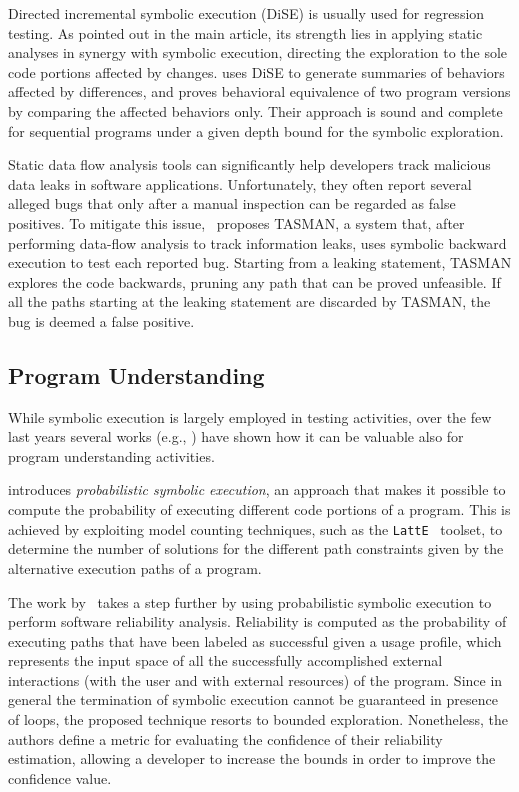 Directed incremental symbolic execution (DiSE) is usually used for regression testing. As pointed out in the main article, its strength lies in applying static analyses in synergy with symbolic execution, directing the exploration to the sole code portions affected by changes. \cite{BPR-SPIN13} uses DiSE to generate summaries of behaviors affected by differences, and proves behavioral equivalence of two program versions by comparing the affected behaviors only. Their approach is sound and complete for sequential programs under a given depth bound for the symbolic exploration.

\smallskip
Static data flow analysis tools can significantly help developers track malicious data leaks in software applications. Unfortunately, they often report several alleged bugs that only after a manual inspection can be regarded as false positives. To mitigate this issue,~\cite{ARH-SOAP15} proposes TASMAN, a system that, after performing data-flow analysis to track information leaks, uses symbolic backward execution to test each reported bug. Starting from a leaking statement, TASMAN explores the code backwards, pruning any path that can be proved unfeasible. If all the paths starting at the leaking statement are discarded by TASMAN, the bug is deemed a false positive.

\subsection{Program Understanding}
While symbolic execution is largely employed in testing activities, over the few last years several works (e.g., \cite{GDV-ISSTA12,FPV-ICSE13,CLL-ICSE16}) have shown how it can be valuable also for program understanding activities.

\cite{GDV-ISSTA12} introduces {\em probabilistic symbolic execution}, an approach that makes it possible to compute the probability of executing different code portions of a program. This is achieved by exploiting model counting techniques, such as the {\tt LattE}~\cite{LHT-JSC04} toolset, to determine the number of solutions for the different path constraints given by the alternative execution paths of a program.

The work by~\cite{FPV-ICSE13} takes a step further by using probabilistic symbolic execution to perform software reliability analysis. Reliability is computed as the probability of executing paths that have been labeled as successful given a usage profile, which represents the input space of all the successfully accomplished external interactions (with the user and with external resources) of the program.  Since in general the termination of symbolic execution cannot be guaranteed in presence of loops, the proposed technique resorts to bounded exploration. Nonetheless, the authors define a metric for evaluating the confidence of their reliability estimation, allowing a developer to increase the bounds in order to improve the confidence value.

